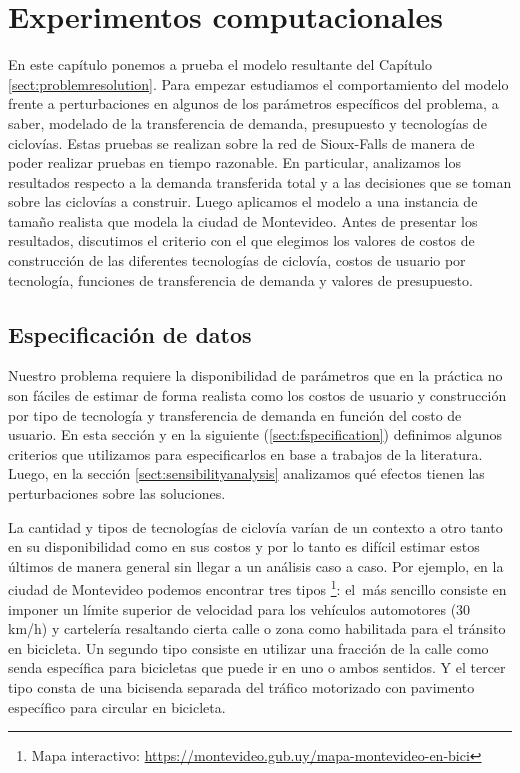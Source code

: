 \chapter{Experimentos computacionales}
\label{sect:problemresults}

En este capítulo ponemos a prueba el modelo resultante del Capítulo \ref{sect:problemresolution}. Para empezar estudiamos el comportamiento del modelo frente a perturbaciones en algunos de los parámetros específicos del problema, a saber, modelado de la transferencia de demanda, presupuesto y tecnologías de ciclovías. Estas pruebas se realizan sobre la red de Sioux-Falls de manera de poder realizar pruebas en tiempo razonable. En particular, analizamos los resultados respecto a la demanda transferida total y a las decisiones que se toman sobre las ciclovías a construir. Luego aplicamos el modelo a una instancia de tamaño realista que modela la ciudad de Montevideo. Antes de presentar los resultados, discutimos el criterio con el que elegimos los valores de costos de construcción de las diferentes tecnologías de ciclovía, costos de usuario por tecnología, funciones de transferencia de demanda y valores de presupuesto.

\section{Especificación de datos}
\label{sect:dataspecification}

Nuestro problema requiere la disponibilidad de parámetros que en la práctica no son fáciles de estimar de forma realista como los costos de usuario y construcción por tipo de tecnología y transferencia de demanda en función del costo de usuario. En esta sección y en la siguiente (\ref{sect:fspecification}) definimos algunos criterios que utilizamos para especificarlos en base a trabajos de la literatura. Luego, en la sección \ref{sect:sensibilityanalysis} analizamos qué efectos tienen las perturbaciones sobre las soluciones.

La cantidad y tipos de tecnologías de ciclovía varían de un contexto a otro tanto en su disponibilidad como en sus costos y por lo tanto es difícil estimar estos últimos de manera general sin llegar a un análisis caso a caso. Por ejemplo, en la ciudad de Montevideo podemos encontrar tres tipos \footnote{Mapa interactivo: \url{https://montevideo.gub.uy/mapa-montevideo-en-bici}}: el más sencillo consiste en imponer un límite superior de velocidad para los vehículos automotores (30 km/h) y cartelería resaltando cierta calle o zona como habilitada para el tránsito en bicicleta. Un segundo tipo consiste en utilizar una fracción de la calle como senda específica para bicicletas que puede ir en uno o ambos sentidos. Y el tercer tipo consta de una bicisenda separada del tráfico motorizado con pavimento específico para circular en bicicleta.

